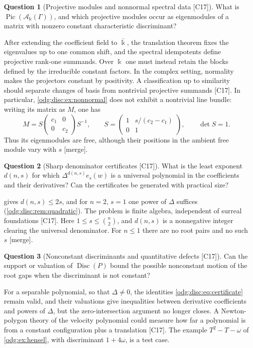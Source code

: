 \documentclass[11pt,oneside]{article}
\numberwithin{equation}{section}
\theoremstyle{definition}
\newtheorem{question}[question]{Question}
\theoremstyle{remark}
\newcommand{\src}[1]{\textup{\textsf{\small[#1]}}}
\newcommand{\mergetag}{\textup{\textsf{\small[merge]}}}
\newcommand{\crA}{\mathcal A_\Bbbk(\Gamma)}
\newcommand{\Disc}{\operatorname{Disc}}
\begin{document}
\begin{question}[Projective modules and nonnormal spectral data \src{C17}]\label{odg:disc:q:picard}
What is $\operatorname{Pic}(\crA)$, and which projective modules occur as eigenmodules of a
matrix with nonzero constant characteristic discriminant?
\end{question}
After extending the coefficient field to $\bar\Bbbk$, the translation theorem fixes the
eigenvalues up to one common shift, and the spectral idempotents define projective
rank-one summands. Over $\Bbbk$ one must instead retain the blocks defined by the
irreducible constant factors. In the complex setting, normality makes the projectors
constant by positivity. A classification up to similarity should separate changes of
basis from nontrivial projective summands \src{C17}.
In particular, \cref{odg:disc:ex:nonnormal} does not exhibit a nontrivial line bundle:
writing its matrix as $M$, one has
\[
 M=S\begin{pmatrix}c_1&0\\0&c_2\end{pmatrix}S^{-1},\qquad
 S=\begin{pmatrix}1&s/(c_2-c_1)\\0&1\end{pmatrix},\qquad \det S=1.
\]
Thus its eigenmodules are free, although their positions in the ambient free module
vary with $s$ \mergetag.

\begin{question}[Sharp denominator certificates \src{C17}]\label{odg:disc:q:certificate}
What is the least exponent $d(n,s)$ for which $\Delta^{d(n,s)}e_s(w)$ is a universal
polynomial in the coefficients and their derivatives? Can the certificates be generated
with practical size?
\end{question}
 gives $d(n,s)\le2s$, and for $n=2$, $s=1$ one power of
$\Delta$ suffices (\cref{odg:disc:rem:quadratic}). The problem is finite algebra,
independent of surreal foundations \src{C17}. Here $1\le s\le\binom n2$, and
$d(n,s)$ is a nonnegative integer clearing the universal denominator. For $n\le1$
there are no root pairs and no such $s$ \mergetag.

\begin{question}[Nonconstant discriminants and quantitative defects \src{C17}]\label{odg:disc:q:defect}
Can the support or valuation of $\Disc(P)$ bound the possible nonconstant motion of the root
gaps when the discriminant is not constant?
\end{question}
For a separable polynomial, so that $\Delta\ne0$, the identities
\eqref{odg:disc:eq:certificate} remain valid, and their valuations give
inequalities between derivative coefficients and powers of $\Delta$, but the
zero-intersection argument no longer closes. A Newton-polygon theory of the velocity
polynomial could measure how far a polynomial is from a constant configuration plus a
translation \src{C17}. The example $T^2-T-\omega$ of \cref{odg:ex:hensel}, with
discriminant $1+4\omega$, is a test case.
\end{document}

